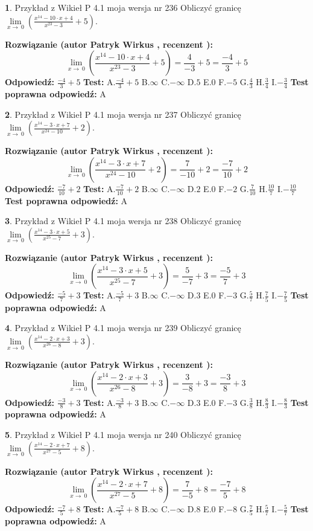 \documentclass[12pt, a4paper]{article}
\theoremstyle{definition} %
\newtheorem{zad}{}
\newcommand{\zadStart}[1]{\begin{zad}#1\newline}
\newcommand{\zadStop}{\end{zad}}
\newcommand{\rozwStart}[2]{\noindent \textbf{Rozwiązanie (autor #1 , recenzent #2): }\newline}
\newcommand{\rozwStop}{\newline}
\newcommand{\odpStart}{\noindent \textbf{Odpowiedź:}\newline}
\newcommand{\odpStop}{\newline}
\newcommand{\testStart}{\noindent \textbf{Test:}\newline}
\newcommand{\testStop}{\newline}
\newcommand{\kluczStart}{\noindent \textbf{Test poprawna odpowiedź:}\newline}
\newcommand{\kluczStop}{\newline}
\begin{document}
\zadStart{Przykład z Wikieł P 4.1 moja wersja nr 236}
Obliczyć granicę $\lim\limits_{x\to\ 0}(\frac{x^{14}-10 \cdot x +4}{x^{23}-3}+5)$.
\zadStop
\rozwStart{Patryk Wirkus}{}
$$\lim\limits_{x\to\ 0}(\frac{x^{14}-10 \cdot x +4}{x^{23}-3}+5)=\frac{4}{-3}+5=\frac{-4}{3}+5$$
\rozwStop
\odpStart
$\frac{-4}{3}+5$
\odpStop
\testStart
A.$\frac{-4}{3}+5$
B.$\infty$
C.$-\infty$
D.$5$
E.$0$
F.$-5$
G.$\frac{4}{3}$
H.$\frac{3}{4}$
I.$-\frac{3}{4}$
\testStop
\kluczStart
A
\kluczStop



\zadStart{Przykład z Wikieł P 4.1 moja wersja nr 237}
Obliczyć granicę $\lim\limits_{x\to\ 0}(\frac{x^{14}-3 \cdot x +7}{x^{24}-10}+2)$.
\zadStop
\rozwStart{Patryk Wirkus}{}
$$\lim\limits_{x\to\ 0}(\frac{x^{14}-3 \cdot x +7}{x^{24}-10}+2)=\frac{7}{-10}+2=\frac{-7}{10}+2$$
\rozwStop
\odpStart
$\frac{-7}{10}+2$
\odpStop
\testStart
A.$\frac{-7}{10}+2$
B.$\infty$
C.$-\infty$
D.$2$
E.$0$
F.$-2$
G.$\frac{7}{10}$
H.$\frac{10}{7}$
I.$-\frac{10}{7}$
\testStop
\kluczStart
A
\kluczStop



\zadStart{Przykład z Wikieł P 4.1 moja wersja nr 238}
Obliczyć granicę $\lim\limits_{x\to\ 0}(\frac{x^{14}-3 \cdot x +5}{x^{25}-7}+3)$.
\zadStop
\rozwStart{Patryk Wirkus}{}
$$\lim\limits_{x\to\ 0}(\frac{x^{14}-3 \cdot x +5}{x^{25}-7}+3)=\frac{5}{-7}+3=\frac{-5}{7}+3$$
\rozwStop
\odpStart
$\frac{-5}{7}+3$
\odpStop
\testStart
A.$\frac{-5}{7}+3$
B.$\infty$
C.$-\infty$
D.$3$
E.$0$
F.$-3$
G.$\frac{5}{7}$
H.$\frac{7}{5}$
I.$-\frac{7}{5}$
\testStop
\kluczStart
A
\kluczStop



\zadStart{Przykład z Wikieł P 4.1 moja wersja nr 239}
Obliczyć granicę $\lim\limits_{x\to\ 0}(\frac{x^{14}-2 \cdot x +3}{x^{26}-8}+3)$.
\zadStop
\rozwStart{Patryk Wirkus}{}
$$\lim\limits_{x\to\ 0}(\frac{x^{14}-2 \cdot x +3}{x^{26}-8}+3)=\frac{3}{-8}+3=\frac{-3}{8}+3$$
\rozwStop
\odpStart
$\frac{-3}{8}+3$
\odpStop
\testStart
A.$\frac{-3}{8}+3$
B.$\infty$
C.$-\infty$
D.$3$
E.$0$
F.$-3$
G.$\frac{3}{8}$
H.$\frac{8}{3}$
I.$-\frac{8}{3}$
\testStop
\kluczStart
A
\kluczStop



\zadStart{Przykład z Wikieł P 4.1 moja wersja nr 240}
Obliczyć granicę $\lim\limits_{x\to\ 0}(\frac{x^{14}-2 \cdot x +7}{x^{27}-5}+8)$.
\zadStop
\rozwStart{Patryk Wirkus}{}
$$\lim\limits_{x\to\ 0}(\frac{x^{14}-2 \cdot x +7}{x^{27}-5}+8)=\frac{7}{-5}+8=\frac{-7}{5}+8$$
\rozwStop
\odpStart
$\frac{-7}{5}+8$
\odpStop
\testStart
A.$\frac{-7}{5}+8$
B.$\infty$
C.$-\infty$
D.$8$
E.$0$
F.$-8$
G.$\frac{7}{5}$
H.$\frac{5}{7}$
I.$-\frac{5}{7}$
\testStop
\kluczStart
A
\kluczStop
\end{document}

